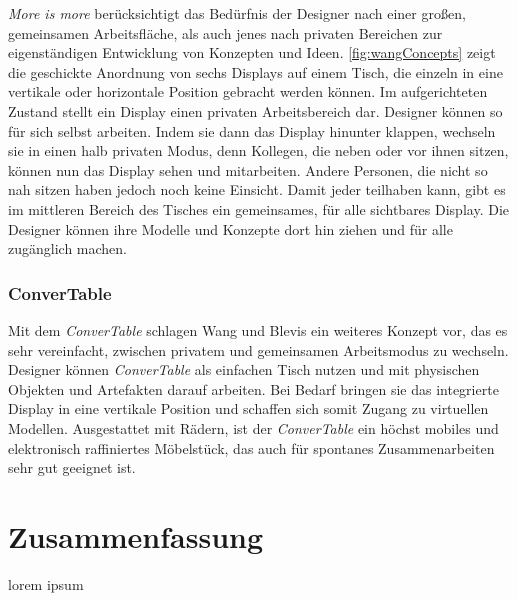 \emph{More is more} berücksichtigt das Bedürfnis der Designer nach einer großen, gemeinsamen Arbeitsfläche, als auch jenes nach privaten Bereichen zur eigenständigen Entwicklung von Konzepten und Ideen. \autoref{fig:wangConcepts} zeigt die geschickte Anordnung von sechs Displays auf einem Tisch, die einzeln in eine vertikale oder horizontale Position gebracht werden können. Im aufgerichteten Zustand stellt ein Display einen privaten Arbeitsbereich dar. Designer können so für sich selbst arbeiten. Indem sie dann das Display hinunter klappen, wechseln sie in einen halb privaten Modus, denn Kollegen, die neben oder vor ihnen sitzen, können nun das Display sehen und mitarbeiten. Andere Personen, die nicht so nah sitzen haben jedoch noch keine Einsicht. Damit jeder teilhaben kann, gibt es im mittleren Bereich des Tisches ein gemeinsames, für alle sichtbares Display. Die Designer können ihre Modelle und Konzepte dort hin ziehen und für alle zugänglich machen.

\subsubsection{ConverTable}

Mit dem \emph{ConverTable} schlagen Wang und Blevis ein weiteres Konzept vor, das es sehr vereinfacht, zwischen privatem und gemeinsamen Arbeitsmodus zu wechseln. Designer können \emph{ConverTable} als einfachen Tisch nutzen und mit physischen Objekten und Artefakten darauf arbeiten. Bei Bedarf bringen sie das integrierte Display in eine vertikale Position und schaffen sich somit Zugang zu virtuellen Modellen. Ausgestattet mit Rädern, ist der \emph{ConverTable} ein höchst mobiles und elektronisch raffiniertes Möbelstück, das auch für spontanes Zusammenarbeiten sehr gut geeignet ist.

\section*{Zusammenfassung}
lorem ipsum

